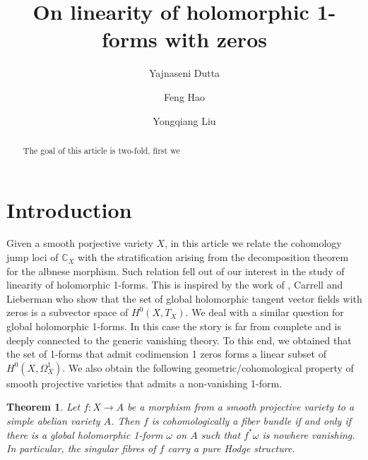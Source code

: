 \documentclass[11pt,reqno]{amsart}
\title{}
\newtheorem{alphtheorem}{Theorem}
\theoremstyle{definition}
\theoremstyle{remark}
\theoremstyle{cited}
\theoremstyle{citeddef}
\newcommand{\bbC}{\mathbb{C}}
\begin{document}
  
\title[Cohomology jump loci and holomorphic 1-forms with zeros]{On linearity of holomorphic 1-forms with zeros} 

\author{Yajnaseni Dutta}


\author{Feng Hao}


\author{Yongqiang Liu}






\begin{abstract} 
The goal of this article is two-fold, first we 
\end{abstract}

\maketitle
\section{Introduction}\label{intro}
Given a smooth porjective variety $X$, in this article we relate the cohomology jump loci of $\bbC_X$ with the 
stratification arising from the decomposition theorem for the albnese morphism. Such relation fell out of our interest in the
study of linearity of holomorphic 1-forms. This is inspired by the work of  \cite{CL73}, Carrell and Lieberman 
who show that the set of global holomorphic tangent vector fields with zeros is a subvector space of $H^0(X, T_X)$. We deal with a similar question for global holomorphic 1-forms. In this case the story is far from complete and is deeply connected to the generic
vanishing theory. To this end, we obtained that the set of 1-forms that admit codimension 1 zeros forms a linear subset of $H^0(X, \Omega_X^1)$. We also obtain the following geometric/cohomological property of smooth projective varieties that
admits a non-vanishing 1-form. 



\begin{alphtheorem}\label{thm:smooth}
Let $f:X\to A$ be a morphism from a smooth projective variety to a simple abelian variety $A$. Then $f$ is cohomologically a fiber bundle if and only if there is a global holomorphic 1-form $\omega$ on $A$ such that $f^*\omega$ is nowhere vanishing.  In particular, the
singular fibres of $f$ carry a pure Hodge structure.
\end{alphtheorem}
\end{document}
